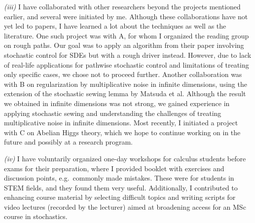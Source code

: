 \documentclass[./Research_statement.tex]{subfiles}
\begin{document}
\noindent \textit{(iii)} I have collaborated with other researchers beyond the projects mentioned earlier, and several were initiated by me. Although these collaborations have not yet led to papers, I have learned a lot about the techniques as well as the literature. One such project was with A, for whom I organized the reading group on rough paths. Our goal was to apply an algorithm from their paper involving stochastic control for SDEs but with a rough driver instead. However, due to  lack of real-life applications for pathwise stochastic control and limitations of treating only specific cases, we chose not to proceed further. Another collaboration was with B on regularization by multiplicative noise in infinite dimensions, using the extension of the stochastic sewing lemma by Matsuda et al. Although the result we obtained in infinite dimensions was not strong, we gained experience in applying stochastic sewing and understanding the challenges of treating multiplicative noise in infinite dimensions. Most recently, I initiated a project with C on Abelian Higgs theory, which we hope to continue working on in the future and possibly at a research program.



\vspace{2pt}

\noindent \textit{(iv)}
 I have voluntarily organized  one-day workshops for calculus students before exams for their preparation, where I provided booklet with exercises and discussion points, e.g.\ commonly made mistakes. These were for students in STEM fields, and they found them very useful. Additionally, I contributed to enhancing course material by selecting difficult topics and writing scripts for video lectures (recorded by the lecturer) aimed at broadening access for an MSc course in stochastics. 
\end{document}
